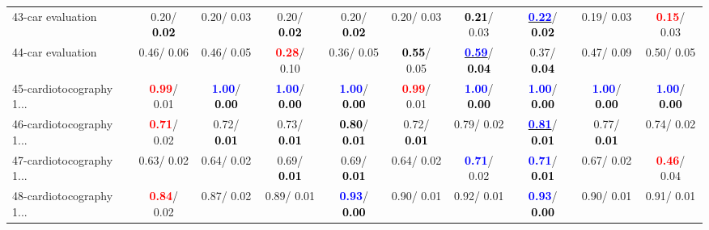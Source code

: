 \begin{table}[h]
\begin{center}
{\begin{tabular}{lc|c|c|c|c|c|c|c|c}
43-car evaluation &   0.20/\textcolor{black}{\textbf{  0.02}} &   0.20/  0.03 &   0.20/\textcolor{black}{\textbf{  0.02}} &   0.20/\textcolor{black}{\textbf{  0.02}} &   0.20/  0.03 & \textcolor{black}{\textbf{  0.21}}/  0.03 & \underline{\textcolor{blue}{\textbf{  0.22}}}/\textcolor{black}{\textbf{  0.02}} &   0.19/  0.03 & \textcolor{red}{\textbf{  0.15}}/  0.03 \\
44-car evaluation &   0.46/  0.06 &   0.46/  0.05 & \textcolor{red}{\textbf{  0.28}}/  0.10 &   0.36/  0.05 & \textcolor{black}{\textbf{  0.55}}/  0.05 & \underline{\textcolor{blue}{\textbf{  0.59}}}/\textcolor{black}{\textbf{  0.04}} &   0.37/\textcolor{black}{\textbf{  0.04}} &   0.47/  0.09 &   0.50/  0.05 \\
45-cardiotocography 1... & \textcolor{red}{\textbf{  0.99}}/  0.01 & \textcolor{blue}{\textbf{  1.00}}/\textcolor{black}{\textbf{  0.00}} & \textcolor{blue}{\textbf{  1.00}}/\textcolor{black}{\textbf{  0.00}} & \textcolor{blue}{\textbf{  1.00}}/\textcolor{black}{\textbf{  0.00}} & \textcolor{red}{\textbf{  0.99}}/  0.01 & \textcolor{blue}{\textbf{  1.00}}/\textcolor{black}{\textbf{  0.00}} & \textcolor{blue}{\textbf{  1.00}}/\textcolor{black}{\textbf{  0.00}} & \textcolor{blue}{\textbf{  1.00}}/\textcolor{black}{\textbf{  0.00}} & \textcolor{blue}{\textbf{  1.00}}/\textcolor{black}{\textbf{  0.00}} \\
46-cardiotocography 1... & \textcolor{red}{\textbf{  0.71}}/  0.02 &   0.72/\textcolor{black}{\textbf{  0.01}} &   0.73/\textcolor{black}{\textbf{  0.01}} & \textcolor{black}{\textbf{  0.80}}/\textcolor{black}{\textbf{  0.01}} &   0.72/\textcolor{black}{\textbf{  0.01}} &   0.79/  0.02 & \underline{\textcolor{blue}{\textbf{  0.81}}}/\textcolor{black}{\textbf{  0.01}} &   0.77/\textcolor{black}{\textbf{  0.01}} &   0.74/  0.02 \\ \hline
47-cardiotocography 1... &   0.63/  0.02 &   0.64/  0.02 &   0.69/\textcolor{black}{\textbf{  0.01}} &   0.69/\textcolor{black}{\textbf{  0.01}} &   0.64/  0.02 & \textcolor{blue}{\textbf{  0.71}}/  0.02 & \textcolor{blue}{\textbf{  0.71}}/\textcolor{black}{\textbf{  0.01}} &   0.67/  0.02 & \textcolor{red}{\textbf{  0.46}}/  0.04 \\
48-cardiotocography 1... & \textcolor{red}{\textbf{  0.84}}/  0.02 &   0.87/  0.02 &   0.89/  0.01 & \textcolor{blue}{\textbf{  0.93}}/\textcolor{black}{\textbf{  0.00}} &   0.90/  0.01 &   0.92/  0.01 & \textcolor{blue}{\textbf{  0.93}}/\textcolor{black}{\textbf{  0.00}} &   0.90/  0.01 &   0.91/  0.01 \\

\end{tabular}}
\end{center}
\end{table}
